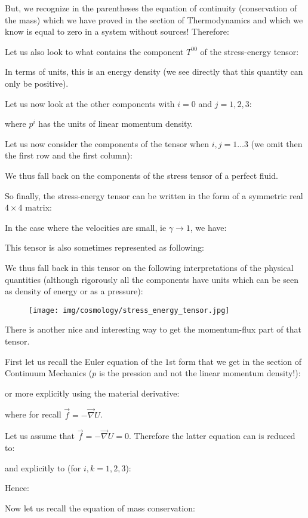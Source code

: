 	But, we recognize in the parentheses the equation of continuity (conservation of the mass) which we have proved in the section of Thermodynamics and which we know is equal to zero in a system without sources! Therefore:
	
	Let us also look to what contains the component $T^{00}$ of the stress-energy tensor:
	
	In terms of units, this is an energy density (we see directly that this quantity can only be positive).

	Let us now look at the other components with $i=0$ and $j=1,2,3$:
	
	where $p^i$ has the units of linear momentum density.

	Let us now consider the components of the tensor when $i,j=1\ldots 3$ (we omit then the first row and the first column):
	
	We thus fall back on the components of the stress tensor of a perfect fluid.

	So finally, the stress-energy tensor can be written in the form of a symmetric real $4\times 4$ matrix:
	
	In the case where the velocities are small, ie $\gamma\rightarrow 1$, we have:
	
	This tensor is also sometimes represented as following:
	
	We thus fall back in this tensor on the following interpretations of the physical quantities (although rigorously all the components have units which can be seen as density of energy or as a pressure):
	\begin{figure}[H]
		\centering
		\texttt{[image: img/cosmology/stress\_energy\_tensor.jpg]}	
	\end{figure}
	There is another nice and interesting way to get the momentum-flux part of that tensor. 
	
	First let us recall the Euler equation of the $1$st form that we get in the section of Continuum Mechanics ($p$ is the pression and not the linear momentum density!):
	
	or more explicitly using the material derivative:
	
	where for recall $\vec{f}=-\vec{\nabla}U$.
	
	Let us assume that $\vec{f}=-\vec{\nabla}U=0$. Therefore the latter equation can is reduced to:
	
	and explicitly to (for $i,k=1,2,3$):
	
	Hence:
	
	Now let us recall the equation of mass conservation:
	

